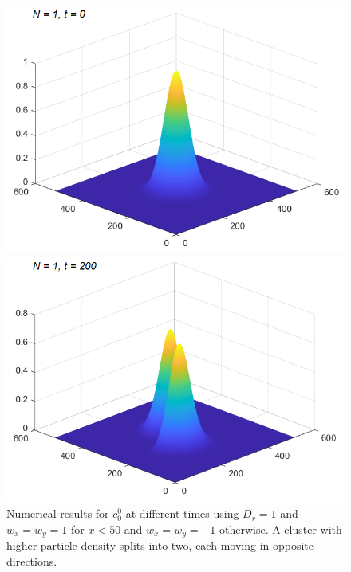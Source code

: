 \begin{frame}
	\scriptsize
	\begin{figure}[H]
		\centering
		\begin{minipage}{0.4\textwidth}
			\includegraphics[scale=0.3]{Bilder_wxwy/t=0_wxwy=1_wxwy=-1}
		\end{minipage}
		\hfill 
		\begin{minipage}{0.4\textwidth}
			\includegraphics[scale=0.3]{Bilder_wxwy/t=200_wxwy=1_wxwy=-1}
		\end{minipage}
		\caption{Numerical results for $c^0_0$ at different times using $D_r=1$ and $w_x=w_y=1$ for $x<50$ and $w_x=w_y=-1$ otherwise. A cluster with higher particle density splits into two, each moving in opposite directions.}
		

\end{figure}
\end{frame}
